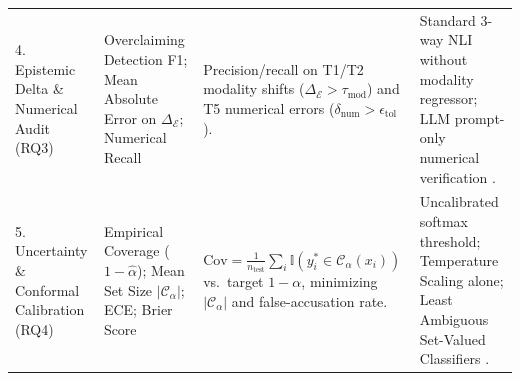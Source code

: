 \documentclass[journal]{IEEEtran}
\begin{document}
\begin{table}[t]
\begin{tabularx}{\textwidth}{L{2.7cm} L{3.3cm} L{4.2cm} Y}
4. Epistemic Delta \& Numerical Audit (RQ3) & Overclaiming Detection F1; Mean Absolute Error on $\Delta_{\mathcal{E}}$; Numerical Recall & Precision/recall on T1/T2 modality shifts ($\Delta_{\mathcal{E}} > \tau_{\text{mod}}$) and T5 numerical errors ($\delta_{\text{num}} > \epsilon_{\text{tol}}$). & Standard 3-way NLI without modality regressor; LLM prompt-only numerical verification \cite{lu2023scitab,akhtar2023reading}. \\
5. Uncertainty \& Conformal Calibration (RQ4) & Empirical Coverage ($1-\hat{\alpha}$); Mean Set Size $|\mathcal{C}_{\alpha}|$; ECE; Brier Score & $\text{Cov} = \frac{1}{n_{\text{test}}}\sum_{i} \mathbb{I}(y_i^* \in \mathcal{C}_{\alpha}(x_i))$ vs.\ target $1-\alpha$, minimizing $|\mathcal{C}_{\alpha}|$ and false-accusation rate. & Uncalibrated softmax threshold; Temperature Scaling alone; Least Ambiguous Set-Valued Classifiers \cite{sadinle2019least,angelopoulos2023conformal}. \\
\bottomrule
\end{tabularx}
\end{table}
\end{document}
